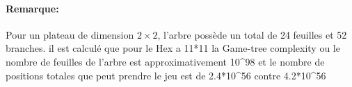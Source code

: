 \paragraph {Remarque:}
Pour un plateau de dimension $2\times2$, l'arbre possède un total de 24 feuilles et 52 branches.
il est calculé que pour le Hex a 11*11 la Game-tree complexity ou le nombre de feuilles de l'arbre est
approximativement 10^98 et le nombre de positions totales que peut prendre le jeu est de 2.4*10^56 contre
4.2*10^56

